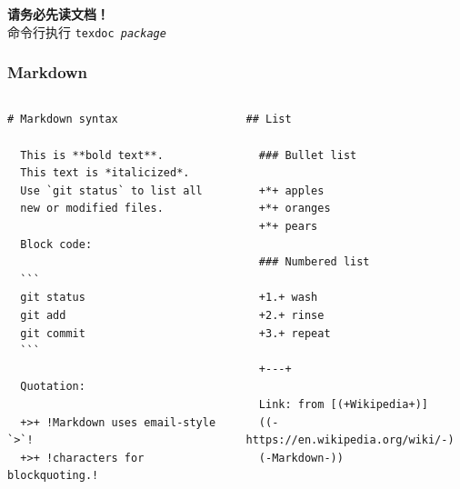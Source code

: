 \begin{frame}[standout]
  \huge \textbf{请务必先读文档！} \\[1ex] \pause
  \footnotesize 命令行执行 \texttt{texdoc \textit{package}}
\end{frame}

\begin{frame}[fragile]
\frametitle[Markdown]{%
  Markdown }
\begin{columns}
\begin{column}{0.48\textwidth}
  \begin{lstlisting}[gobble=2]
  # Markdown syntax

  This is **bold text**.
  This text is *italicized*.
  Use `git status` to list all
  new or modified files.

  Block code:

  ```
  git status
  git add
  git commit
  ```

  Quotation:

  +>+ !Markdown uses email-style `>`!
  +>+ !characters for blockquoting.!
  \end{lstlisting}
\end{column}
\begin{column}{0.48\textwidth}
  \begin{lstlisting}[gobble=2]
  ## List

  ### Bullet list

  +*+ apples
  +*+ oranges
  +*+ pears

  ### Numbered list

  +1.+ wash
  +2.+ rinse
  +3.+ repeat

  +---+

  Link: from [(+Wikipedia+)]
  ((-https://en.wikipedia.org/wiki/-)
  (-Markdown-))

  \end{lstlisting}
\end{column}
\end{columns}
\vspace{-0.6cm}
\end{frame}


